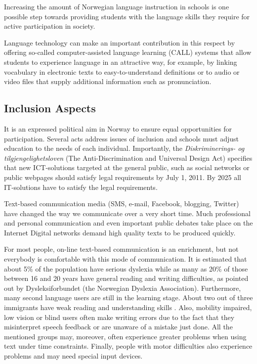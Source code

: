 \begin{multicols}{2}
Increasing the amount of Norwegian language instruction in schools is one possible step towards providing students with the language skills they require for active participation in society. 

Language technology can make an important contribution in this respect by offering so-called computer-assisted language learning (CALL) systems that allow students to experience language in an attractive way, for example, by linking vocabulary in electronic texts to easy-to-understand definitions or to audio or video files that supply additional information such as pronunciation.

\subsection{Inclusion Aspects} 

It is an expressed political aim in Norway to ensure equal opportunities for participation. 
Several acts address issues of inclusion and schools must adjust education to the needs of each individual. 
Importantly, the \textit{Diskriminerings- og tilgjengelighetsloven}  (The Anti-Discrimination and Universal Design Act) specifies that new ICT-solutions targeted at the general public, such as social networks or public webpages should satisfy legal requirements by July 1, 2011. 
By 2025 all IT-solutions have to satisfy the legal requirements. 

Text-based communication media (SMS, e-mail, Facebook, blogging, Twitter) have changed the way we communicate over a very short time. 
Much professional and personal communication and even important public debates take place on the Internet Digital networks demand high quality texts to be produced quickly. 


For most people, on-line text-based communication is an enrichment, but not everybody is comfortable with this mode of communication. 
It is estimated that about 5\% of the population have serious dyslexia while as many as 20\% of those between 16 and 20 years have general reading and writing difficulties, as pointed out by Dysleksiforbundet (the Norwegian Dyslexia Association).
Furthermore, many second language users are still in the learning stage.
About two out of three immigrants have weak reading and understanding skills \cite{gabrielsen2007}.
Also, mobility impaired, low vision or blind users often make writing errors due to the fact that they misinterpret speech feedback or are unaware of a mistake just done. 
All the mentioned groups may, moreover, often experience greater problems when using text under time constraints. 
Finally, people with motor difficulties also experience problems and may need special input devices.


\end{multicols}
